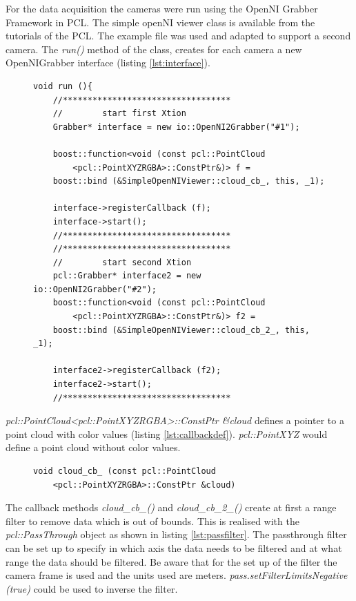 For the data acquisition the cameras were run using the OpenNI Grabber Framework in PCL. The simple openNI viewer class is available from the tutorials of the PCL. The example file was used and adapted to support a second camera. The \emph{run()} method of the class, creates for each camera a new OpenNIGrabber interface (listing \ref{lst:interface}). 
\begin{figure}[H]
\begin{lstlisting}[frame = single, caption={part of the run() function of the simple openNI viewer class}, captionpos=b, label={lst:interface}]  
 void run (){
	//**********************************
	//        start first Xtion
	Grabber* interface = new io::OpenNI2Grabber("#1");

	boost::function<void (const pcl::PointCloud
		<pcl::PointXYZRGBA>::ConstPtr&)> f =
	boost::bind (&SimpleOpenNIViewer::cloud_cb_, this, _1);

	interface->registerCallback (f);
	interface->start();
	//**********************************
	//**********************************
	//        start second Xtion
	pcl::Grabber* interface2 = new io::OpenNI2Grabber("#2");
	boost::function<void (const pcl::PointCloud
		<pcl::PointXYZRGBA>::ConstPtr&)> f2 =
	boost::bind (&SimpleOpenNIViewer::cloud_cb_2_, this, _1);

	interface2->registerCallback (f2);
	interface2->start();
	//**********************************
\end{lstlisting}
\end{figure}
\emph{pcl::PointCloud<pcl::PointXYZRGBA>::ConstPtr \&cloud} defines a pointer to a point cloud with color values (listing \ref{lst:callbackdef}). \emph{pcl::PointXYZ} would define a point cloud without color values. 
\begin{figure}[H]
\begin{lstlisting}[frame = single, caption={Function definition of the callback function, using a pointer to a point cloud with color values.}, captionpos=b, label={lst:callbackdef}]  
void cloud_cb_ (const pcl::PointCloud
	<pcl::PointXYZRGBA>::ConstPtr &cloud)
\end{lstlisting}
\end{figure}
The callback methods \emph{cloud\_cb\_()} and \emph{cloud\_cb\_2\_()} create at first a range filter to remove data which is out of bounds. This is realised with the \emph{pcl::PassThrough} object as shown in listing \ref{lst:passfilter}. The passthrough filter can be set up to specify in which axis the data needs to be filtered and at what range the data should be filtered. Be aware that for the set up of the filter the camera frame is used and the units used are meters. \emph{pass.setFilterLimitsNegative (true)} could be used to inverse the filter.
